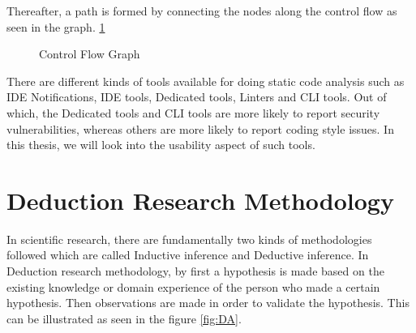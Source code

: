 Thereafter, a path is formed by connecting the nodes along the control flow as seen in the graph. \ref{fig:CFG} \\

\begin{figure}
\centering


\caption{Control Flow Graph}
\label{fig:CFG}
\end{figure} 


There are different kinds of tools available for doing static code analysis such as IDE Notifications, IDE tools, Dedicated tools, Linters and CLI tools. Out of which, the Dedicated tools and CLI tools are more likely to report security vulnerabilities, whereas others are more likely to report coding style issues. In this thesis, we will look into the usability aspect of such tools. 

\section{Deduction Research Methodology}

In scientific research, there are fundamentally two kinds of methodologies followed which are called Inductive inference and Deductive inference.  In Deduction research methodology,  by first a hypothesis is made based on the existing knowledge or domain experience of the person who made a certain hypothesis.  Then observations are made in order to validate the hypothesis. This can be illustrated as seen in the figure \ref{fig:DA}. \\ \\


